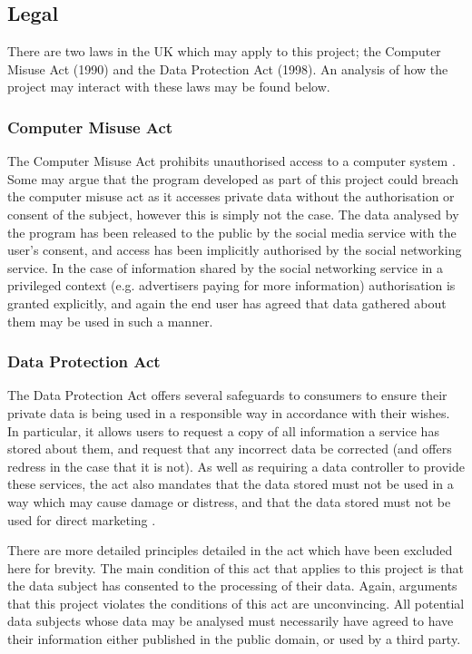 \documentclass[12pt]{article}
\begin{document}
\subsection{Legal}
There are two laws in the UK which may apply to this project; the Computer Misuse Act (1990) and the Data Protection Act (1998). An analysis of how the project may interact with these laws may be found below.

\subsubsection{Computer Misuse Act}
The Computer Misuse Act prohibits unauthorised access to a computer system \citep{computermisuseact}. Some may argue that the program developed as part of this project could breach the computer misuse act as it accesses private data without the authorisation or consent of the subject, however this is simply not the case. The data analysed by the program has been released to the public by the social media service with the user's consent, and access has been implicitly authorised by the social networking service. In the case of information shared by the social networking service in a privileged context (e.g. advertisers paying for more information) authorisation is granted explicitly, and again the end user has agreed that data gathered about them may be used in such a manner.

\subsubsection{Data Protection Act}
The Data Protection Act offers several safeguards to consumers to ensure their private data is being used in a responsible way in accordance with their wishes. In particular, it allows users to request a copy of all information a service has stored about them, and request that any incorrect data be corrected (and offers redress in the case that it is not). As well as requiring a data controller to provide these services, the act also mandates that the data stored must not be used in a way which may cause damage or distress, and that the data stored must not be used for direct marketing \citep{dataprotectionact}.

There are more detailed principles detailed in the act which have been excluded here for brevity. The main condition of this act that applies to this project is that the data subject has consented to the processing of their data. Again, arguments that this project violates the conditions of this act are unconvincing. All potential data subjects whose data may be analysed must necessarily have agreed to have their information either published in the public domain, or used by a third party.
\end{document}

